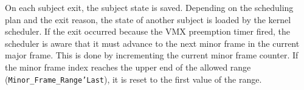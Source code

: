 On each subject exit, the subject state is saved. Depending on the scheduling
plan and the exit reason, the state of another subject is loaded by the kernel
scheduler. If the exit occurred because the VMX preemption timer fired, the
scheduler is aware that it must advance to the next minor frame in the current
major frame. This is done by incrementing the current minor frame counter. If
the minor frame index reaches the upper end of the allowed range
(\texttt{Minor\_Frame\_Range'Last}), it is reset to the first value of the
range.
